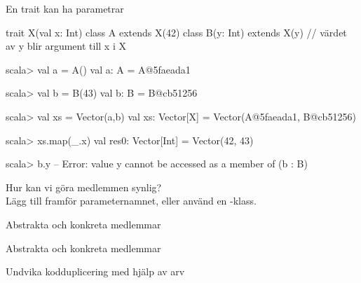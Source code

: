 \begin{Slide}{En trait kan ha parametrar}
\begin{Code}
trait X(val x: Int)
class A extends X(42)  
class B(y: Int) extends X(y) // värdet av y blir argument till x i X  
\end{Code}
\pause\vspace{-0.5em}
\begin{REPLsmall}
scala> val a = A()
val a: A = A@5faeada1

scala> val b = B(43)
val b: B = B@cb51256

scala> val xs = Vector(a,b)
val xs: Vector[X] = Vector(A@5faeada1, B@cb51256)

scala> xs.map(_.x)
val res0: Vector[Int] = Vector(42, 43)

scala> b.y 
--  Error: 
  value y cannot be accessed as a member of (b : B)
\end{REPLsmall}
\SlideFontTiny
Hur kan vi göra medlemmen  synlig? \pause \\Lägg till  framför parameternamnet, eller använd en -klass.
\end{Slide}
  


\ifkompendium
\begin{Slide}{Abstrakta och konkreta medlemmar}
\end{Slide}
\else
\begin{Slide}{Abstrakta och konkreta medlemmar}
\vspace{-0.5em}
\end{Slide}
\fi

\begin{Slide}{Undvika kodduplicering med hjälp av arv}
\ifkompendium
{}
\else
\fi
\end{Slide}




